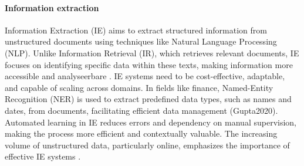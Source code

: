 \paragraph{Information extraction}
Information Extraction (IE) aims to extract structured information from unstructured documents using techniques like Natural Language Processing (NLP). Unlike Information Retrieval (IR), which retrieves relevant documents, IE focuses on identifying specific data within these texts, making information more accessible and analyseerbare \autocite{Javija2024}. IE systems need to be cost-effective, adaptable, and capable of scaling across domains. In fields like finance, Named-Entity Recognition (NER) is used to extract predefined data types, such as names and dates, from documents, facilitating efficient data management (Gupta2020). Automated learning in IE reduces errors and dependency on manual supervision, making the process more efficient and contextually valuable. The increasing volume of unstructured data, particularly online, emphasizes the importance of effective IE systems \autocite{Javija2024}.

